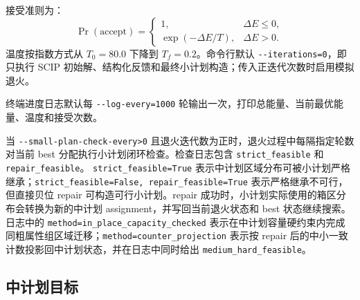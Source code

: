 \documentclass[UTF8,a4paper,11pt]{ctexart}
\newcommand{\code}[1]{\nolinkurl{#1}}
\begin{document}
接受准则为：
\[
\Pr(\text{accept})=
\begin{cases}
1, & \Delta E\le 0,\\
\exp(-\Delta E/T), & \Delta E>0.
\end{cases}
\]
温度按指数方式从 \(T_0=80.0\) 下降到 \(T_f=0.2\)。命令行默认 \code{--iterations=0}，即只执行 SCIP 初始解、结构化反馈和最终小计划构造；传入正迭代次数时启用模拟退火。

终端进度日志默认每 \code{--log-every=1000} 轮输出一次，打印总能量、当前最优能量、温度和接受次数。

当 \code{--small-plan-check-every>0} 且退火迭代数为正时，退火过程中每隔指定轮数对当前 best 分配执行小计划闭环检查。检查日志包含 \code{strict_feasible} 和 \code{repair_feasible}。
\code{strict\_feasible=True} 表示中计划区域分布可被小计划严格继承；\code{strict\_feasible=False, repair\_feasible=True} 表示严格继承不可行，但直接贝位 repair 可构造可行小计划。repair 成功时，小计划实际使用的箱区分布会转换为新的中计划 assignment，并写回当前退火状态和 best 状态继续搜索。日志中的 \code{method=in_place_capacity_checked} 表示在中计划容量硬约束内完成同粗属性组区域迁移；\code{method=counter_projection} 表示按 repair 后的中小一致计数投影回中计划状态，并在日志中同时给出 \code{medium_hard_feasible}。

\subsection{中计划目标}
\end{document}
